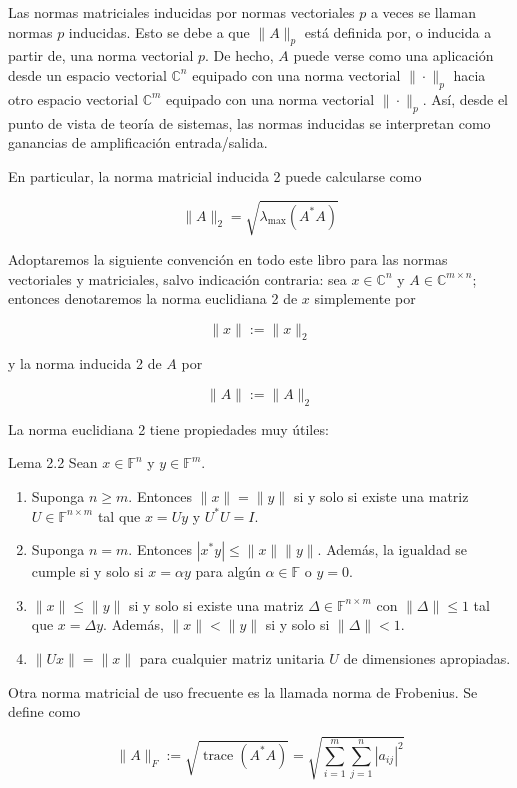 Las normas matriciales inducidas por normas vectoriales $p$ a veces se llaman normas $p$ inducidas. Esto se debe a que $\|A\|_{p}$ está definida por, o inducida a partir de, una norma vectorial $p$. De hecho, $A$ puede verse como una aplicación desde un espacio vectorial $\mathbb{C}^{n}$ equipado con una norma vectorial $\|\cdot\|_{p}$ hacia otro espacio vectorial $\mathbb{C}^{m}$ equipado con una norma vectorial $\|\cdot\|_{p}$. Así, desde el punto de vista de teoría de sistemas, las normas inducidas se interpretan como ganancias de amplificación entrada/salida.

En particular, la norma matricial inducida 2 puede calcularse como

$$
\|A\|_{2}=\sqrt{\lambda_{\max }\left(A^{*} A\right)}
$$

Adoptaremos la siguiente convención en todo este libro para las normas vectoriales y matriciales, salvo indicación contraria: sea $x \in \mathbb{C}^{n}$ y $A \in \mathbb{C}^{m \times n}$; entonces denotaremos la norma euclidiana 2 de $x$ simplemente por

$$
\|x\|:=\|x\|_{2}
$$

y la norma inducida 2 de $A$ por

$$
\|A\|:=\|A\|_{2}
$$

La norma euclidiana 2 tiene propiedades muy útiles:

Lema 2.2 Sean $x \in \mathbb{F}^{n}$ y $y \in \mathbb{F}^{m}$.

\begin{enumerate}
  \item Suponga $n \geq m$. Entonces $\|x\|=\|y\|$ si y solo si existe una matriz $U \in \mathbb{F}^{n \times m}$ tal que $x=U y$ y $U^{*} U=I$.
  \item Suponga $n=m$. Entonces $\left|x^{*} y\right| \leq\|x\|\|y\|$. Además, la igualdad se cumple si y solo si $x=\alpha y$ para algún $\alpha \in \mathbb{F}$ o $y=0$.
  \item $\|x\| \leq\|y\|$ si y solo si existe una matriz $\Delta \in \mathbb{F}^{n \times m}$ con $\|\Delta\| \leq 1$ tal que $x=\Delta y$. Además, $\|x\|<\|y\|$ si y solo si $\|\Delta\|<1$.
  \item $\|U x\|=\|x\|$ para cualquier matriz unitaria $U$ de dimensiones apropiadas.
\end{enumerate}

Otra norma matricial de uso frecuente es la llamada norma de Frobenius. Se define como

$$
\|A\|_{F}:=\sqrt{\operatorname{trace}\left(A^{*} A\right)}=\sqrt{\sum_{i=1}^{m} \sum_{j=1}^{n}\left|a_{i j}\right|^{2}}
$$

